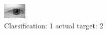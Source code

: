 \begin{figure}[h!]
\begin{center}
\includegraphics[width=0.60\columnwidth]{figures/ID386_class_1_target_2.png}
\end{center}
\caption{ Classification: 1 actual target: 2}
\label{fig:ID386_class_1_target_2}
\end{figure}
